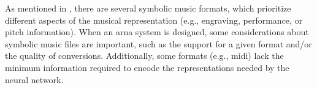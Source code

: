 

As mentioned in , there are
several symbolic music formats, which prioritize different
aspects of the musical representation (e.g., engraving,
performance, or pitch information). When an \gls{arna}
system is designed, some considerations about symbolic music
files are important, such as the support for a given format
and/or the quality of conversions. Additionally, some
formats (e.g., \gls{midi}) lack the minimum information
required to encode the representations needed by the neural
network.
